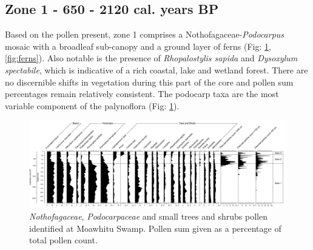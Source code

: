 \documentclass{article}
\begin{document}
 

\subsection{Zone 1 - 650 - 2120 cal. years BP}
Based on the pollen present, zone 1 comprises a Nothofagaceae-\textit{Podocarpus} mosaic with a broadleaf sub-canopy and a ground layer of ferns (Fig: \ref{fig:podo-beach-tree}, \ref{fig:ferns}).  Also notable is the presence of \textit{Rhopalostylis sapida} and \textit{Dysoxylum spectabile}, which is indicative of a rich coastal, lake and wetland forest.  There are no discernible shifts in vegetation during this part of the core and pollen sum percentages remain relatively consistent.  The podocarp taxa are the most variable component of the palynoflora (Fig: \ref{fig:podo-beach-tree}). 

\begin{figure}
	\centering
	\includegraphics[scale=0.07, angle =90]{trees-shrubs-zone-corrected.jpg}
	\caption[\textit{Nothofagaceae}, \textit{Podocarpaceae} and small trees and shrubs identified at Moawhitu Swamp]{\textit{Nothofagaceae}, \textit{Podocarpaceae} and small trees and shrubs pollen identified at Moawhitu Swamp.  Pollen sum given as a percentage of total pollen count.}
	\label{fig:podo-beach-tree}
\end{figure}
\end{document}

